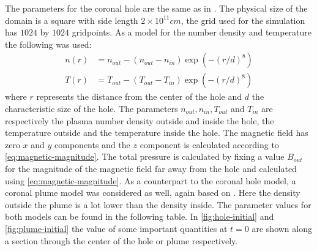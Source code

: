 The parameters for the coronal hole are the same as in \cite{coronal-hole}. 
The physical size of the domain is a square with side length $2\times 10^{11}cm$, the grid used for the simulation has $1024$ by $1024$ gridpoints. As a model for the number density and temperature the following was used:
\begin{equation}
	\label{eq:hole-model}
	\begin{split}
		n(r) &= n_{out} - (n_{out}-n_{in})\exp \left( -(r/d)^8 \right)\\
		T(r) &= T_{out} - (T_{out}-T_{in})\exp \left( -(r/d)^8 \right) 
	\end{split}
\end{equation}
where $r$ represents the distance from the center of the hole and $d$ the characteristic size of the hole. 
The parameters $n_{out}, n_{in}, T_{out}$ and $T_{in}$ are respectively the plasma number density outside and inside the hole, the temperature outside and the temperature inside the hole. 
The magnetic field has zero $x$ and $y$ components and the $z$ component is calculated according to \cref{eq:magnetic-magnitude}.
The total pressure is calculated by fixing a value $B_{out}$ for the magnitude of the magnetic field far away from the hole and calculated using \cref{eq:magnetic-magnitude}.
As a counterpart to the coronal hole model, a coronal plume model was considered as well, again based on \cite{coronal-hole}.
Here the density outside the plume is a lot lower than the density inside.
The parameter values for both models can be found in the following table.
In \cref{fig:hole-initial} and \cref{fig:plume-initial} the value of some important quantities at $t=0$ are shown along a section through the center of the hole or plume respectively.

